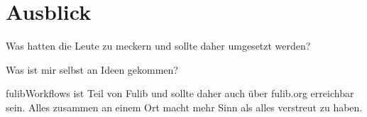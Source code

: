 \chapter{Ausblick}\label{ch:ausblick}
\todo


Was hatten die Leute zu meckern und sollte daher umgesetzt werden?

Was ist mir selbst an Ideen gekommen?


fulibWorkflows ist Teil von Fulib und sollte daher auch über fulib.org erreichbar sein.
Alles zusammen an einem Ort macht mehr Sinn als alles verstreut zu haben.
